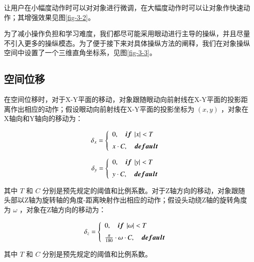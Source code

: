 让用户在小幅度动作时可以对对象进行微调，在大幅度动作时可以让对象作快速动作；其增强效果见图\ref{fig-3-2}。

为了减小操作负担和学习难度，我们都尽可能采用眼动进行主导的操纵，并且尽量不引入更多的操纵模态。为了便于接下来对具体操纵方法的阐释，我们在对象操纵空间中设置了一个三维直角坐标系，见图\ref{fig-3-3}。

\subsection{空间位移}

在空间位移时，对于X-Y平面的移动，对象跟随眼动向前射线在X-Y平面的投影距离作出相应的动作；假设眼动向前射线在X-Y平面的投影坐标为 $(x, y)$ ，对象在X轴向和Y轴向的移动为：

\begin{equation}
	\label{formula-3-2}
	\delta_x = 
    \left\{
    \begin{array}{l}
        0, \quad {\mbox{\boldmath $if$}}\ \left|x\right| < T \\ [0.2cm]
        x \cdot C,\quad {\mbox{\boldmath $default$}}
    \end{array}
    \right.
\end{equation}

\begin{equation}
	\label{formula-3-3}
	\delta_y = 
    \left\{
    \begin{array}{l}
        0, \quad {\mbox{\boldmath $if$}}\ \left|y\right| < T \\ [0.2cm]
        y \cdot C,\quad {\mbox{\boldmath $default$}}
    \end{array}
    \right.
\end{equation}

其中 $T$ 和 $C$ 分别是预先规定的阈值和比例系数。对于Z轴方向的移动，对象跟随头部以Z轴为旋转轴的角度-距离映射作出相应的动作；假设头动绕Z轴的旋转角度为 $\omega$ ，对象在Z轴方向的移动为：

\begin{equation}
	\label{formula-3-4}
	\delta_z = 
    \left\{
    \begin{array}{l}
        0, \quad {\mbox{\boldmath $if$}}\ \left|\omega\right| < T \\ [0.2cm]
        \frac{\pi}{180} \cdot \omega \cdot C,\quad {\mbox{\boldmath $default$}}
    \end{array}
    \right.
\end{equation}

其中 $T$ 和 $C$ 分别是预先规定的阈值和比例系数。

